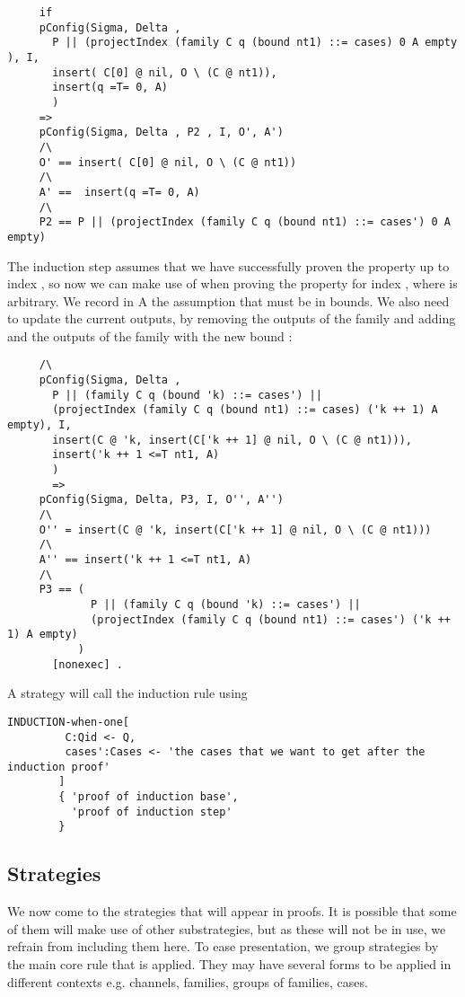\begin{lstlisting}
     if 
     pConfig(Sigma, Delta , 
       P || (projectIndex (family C q (bound nt1) ::= cases) 0 A empty ), I, 
       insert( C[0] @ nil, O \ (C @ nt1)), 
       insert(q =T= 0, A)
       ) 
     => 
     pConfig(Sigma, Delta , P2 , I, O', A')
     /\
     O' == insert( C[0] @ nil, O \ (C @ nt1))
     /\
     A' ==  insert(q =T= 0, A) 
     /\
     P2 == P || (projectIndex (family C q (bound nt1) ::= cases') 0 A empty)
\end{lstlisting}
The induction step assumes that we have successfully proven the 
property up to index , so now we can
make use of  when proving the
property for index , where \code{'k} is arbitrary.
We record in A the assumption that \code{'k + 1} must be in bounds. 
We also need to update the current outputs, by removing the outputs of the family  and adding  and the outputs of the family  with the new bound :
\begin{lstlisting}     
     /\
     pConfig(Sigma, Delta , 
       P || (family C q (bound 'k) ::= cases') || 
       (projectIndex (family C q (bound nt1) ::= cases) ('k ++ 1) A empty), I, 
       insert(C @ 'k, insert(C['k ++ 1] @ nil, O \ (C @ nt1))), 
       insert('k ++ 1 <=T nt1, A)
       )
       =>
     pConfig(Sigma, Delta, P3, I, O'', A'')
     /\
     O'' = insert(C @ 'k, insert(C['k ++ 1] @ nil, O \ (C @ nt1)))
     /\
     A'' == insert('k ++ 1 <=T nt1, A) 
     /\
     P3 == (
             P || (family C q (bound 'k) ::= cases') ||
             (projectIndex (family C q (bound nt1) ::= cases') ('k ++ 1) A empty)
           )
       [nonexec] . 
\end{lstlisting}

A strategy will call the induction rule using
\begin{lstlisting}
INDUCTION-when-one[
         C:Qid <- Q, 
         cases':Cases <- 'the cases that we want to get after the induction proof'
        ]
        { 'proof of induction base',
          'proof of induction step'        
        }
\end{lstlisting}

\subsection{Strategies}

We now come to the strategies that will appear in proofs. It is possible that some of them will make use of other substrategies, but as these will not be in use, we refrain from including them here. To ease presentation,
we group strategies by the main core rule that is applied. They may 
have several forms to be applied in different contexts  
e.g. channels, families, groups of families, cases.

